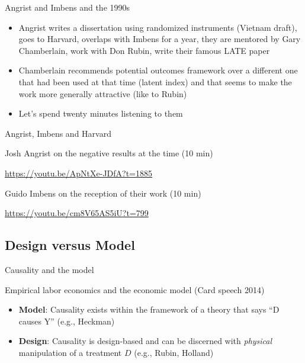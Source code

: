 \documentclass{beamer}
\begin{document}
\begin{frame}{Angrist and Imbens and the 1990s}

  \begin{itemize}
    \item Angrist writes a dissertation using randomized instruments (Vietnam draft), goes to Harvard, overlaps with Imbens for a year, they are mentored by Gary Chamberlain, work with Don Rubin, write their famous LATE paper
    \item Chamberlain recommends potential outcomes framework over a different one that had been used at that time (latent index) and that seems to make the work more generally attractive (like to Rubin)
    \item Let's spend twenty minutes listening to them
  \end{itemize}

\end{frame}

\begin{frame}{Angrist, Imbens and Harvard}


  Josh Angrist on the negative results at the time (10 min)

  \url{https://youtu.be/ApNtXe-JDfA?t=1885}


  \bigskip
  Guido Imbens on the reception of their work (10 min)

  \url{https://youtu.be/cm8V65AS5iU?t=799}

\end{frame}

\subsection{Design versus Model}








\begin{frame}{Causality and the model}

  Empirical labor economics and the economic model (Card speech 2014)

  \bigskip
  \begin{itemize}
    \item \textbf{Model}: Causality exists within the framework of a theory that says ``D causes Y'' (e.g., Heckman)
    \item \textbf{Design}: Causality is design-based and can be discerned with \emph{physical} manipulation of a treatment $D$ (e.g., Rubin, Holland)
  \end{itemize}
\end{frame}
\end{document}
